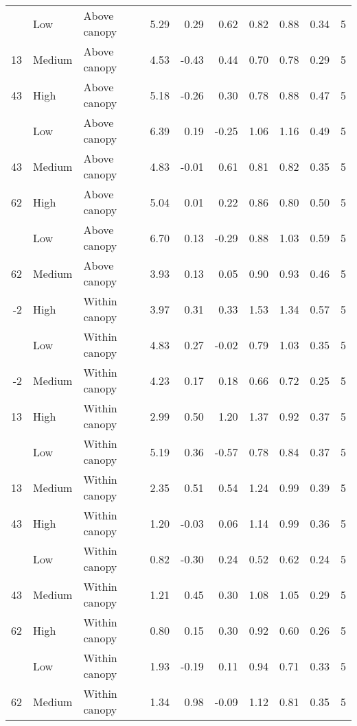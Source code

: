\documentclass[10pt,]{article}
\begin{document}
\begin{longtable}{rllrrrrrrr}
\addlinespace
13 & Low & Above canopy & 5.29 & 0.29 & 0.62 & 0.82 & 0.88 & 0.34 & 5\\
13 & Medium & Above canopy & 4.53 & -0.43 & 0.44 & 0.70 & 0.78 & 0.29 & 5\\
43 & High & Above canopy & 5.18 & -0.26 & 0.30 & 0.78 & 0.88 & 0.47 & 5\\
\addlinespace
43 & Low & Above canopy & 6.39 & 0.19 & -0.25 & 1.06 & 1.16 & 0.49 & 5\\
43 & Medium & Above canopy & 4.83 & -0.01 & 0.61 & 0.81 & 0.82 & 0.35 & 5\\
62 & High & Above canopy & 5.04 & 0.01 & 0.22 & 0.86 & 0.80 & 0.50 & 5\\
\addlinespace
62 & Low & Above canopy & 6.70 & 0.13 & -0.29 & 0.88 & 1.03 & 0.59 & 5\\
62 & Medium & Above canopy & 3.93 & 0.13 & 0.05 & 0.90 & 0.93 & 0.46 & 5\\
-2 & High & Within canopy & 3.97 & 0.31 & 0.33 & 1.53 & 1.34 & 0.57 & 5\\
\addlinespace
-2 & Low & Within canopy & 4.83 & 0.27 & -0.02 & 0.79 & 1.03 & 0.35 & 5\\
-2 & Medium & Within canopy & 4.23 & 0.17 & 0.18 & 0.66 & 0.72 & 0.25 & 5\\
13 & High & Within canopy & 2.99 & 0.50 & 1.20 & 1.37 & 0.92 & 0.37 & 5\\
\addlinespace
13 & Low & Within canopy & 5.19 & 0.36 & -0.57 & 0.78 & 0.84 & 0.37 & 5\\
13 & Medium & Within canopy & 2.35 & 0.51 & 0.54 & 1.24 & 0.99 & 0.39 & 5\\
43 & High & Within canopy & 1.20 & -0.03 & 0.06 & 1.14 & 0.99 & 0.36 & 5\\
\addlinespace
43 & Low & Within canopy & 0.82 & -0.30 & 0.24 & 0.52 & 0.62 & 0.24 & 5\\
43 & Medium & Within canopy & 1.21 & 0.45 & 0.30 & 1.08 & 1.05 & 0.29 & 5\\
62 & High & Within canopy & 0.80 & 0.15 & 0.30 & 0.92 & 0.60 & 0.26 & 5\\
\addlinespace
62 & Low & Within canopy & 1.93 & -0.19 & 0.11 & 0.94 & 0.71 & 0.33 & 5\\
62 & Medium & Within canopy & 1.34 & 0.98 & -0.09 & 1.12 & 0.81 & 0.35 & 5\\*
\end{longtable}\endgroup{}

\clearpage
\begingroup\fontsize{7}{9}\selectfont
\end{document}
